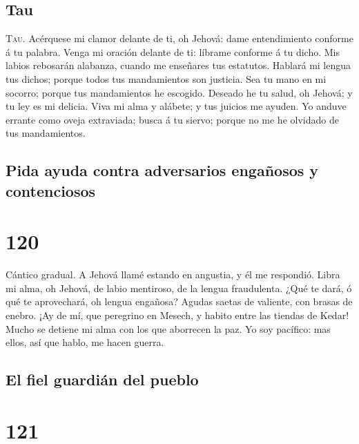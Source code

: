 \hypertarget{tau}{%
\subsection{Tau}\label{tau}}

 \textsc{Tau}. Acérquese mi clamor delante de ti, oh
Jehová: dame entendimiento conforme á tu palabra.  Venga
mi oración delante de ti: líbrame conforme á tu dicho. 
Mis labios rebosarán alabanza, cuando me enseñares tus estatutos.
 Hablará mi lengua tus dichos; porque todos tus
mandamientos son justicia.  Sea tu mano en mi socorro;
porque tus mandamientos he escogido.  Deseado he tu
salud, oh Jehová; y tu ley es mi delicia.  Viva mi alma
y alábete; y tus juicios me ayuden.  Yo anduve errante
como oveja extraviada; busca á tu siervo; porque no me he olvidado de
tus mandamientos.

\hypertarget{pida-ayuda-contra-adversarios-engauxf1osos-y-contenciosos}{%
\subsection{Pida ayuda contra adversarios engañosos y
contenciosos}\label{pida-ayuda-contra-adversarios-engauxf1osos-y-contenciosos}}

\hypertarget{section-119}{%
\section{120}\label{section-119}}

 Cántico gradual. A Jehová llamé estando en angustia, y él
me respondió.  Libra mi alma, oh Jehová, de labio
mentiroso, de la lengua fraudulenta.  ¿Qué te dará, ó qué
te aprovechará, oh lengua engañosa?  Agudas saetas de
valiente, con brasas de enebro.  ¡Ay de mí, que peregrino
en Mesech, y habito entre las tiendas de Kedar!  Mucho se
detiene mi alma con los que aborrecen la paz.  Yo soy
pacífico: mas ellos, así que hablo, me hacen guerra.

\hypertarget{el-fiel-guardiuxe1n-del-pueblo}{%
\subsection{El fiel guardián del
pueblo}\label{el-fiel-guardiuxe1n-del-pueblo}}

\hypertarget{section-120}{%
\section{121}\label{section-120}}

